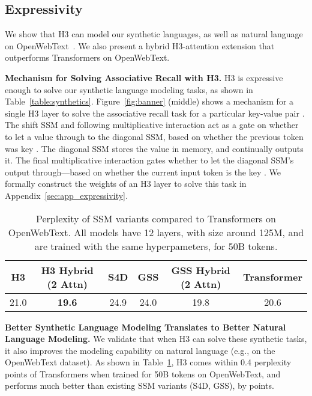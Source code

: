 \documentclass{article}
\newcommand{\hthree}{\textsc{H3}\xspace}
\begin{document}
\subsection{Expressivity}
\label{sec:expressivity}

We show that \hthree can model our synthetic languages, as well as natural language on OpenWebText~\citep{Gokaslan2019OpenWeb}.
We also present a hybrid \hthree-attention extension that outperforms Transformers on OpenWebText.

\textbf{Mechanism for Solving Associative Recall with H3.}
\hthree is expressive enough to solve our synthetic language modeling tasks, as shown in Table~\ref{table:synthetics}.
Figure~\ref{fig:banner} (middle) shows a mechanism for a single \hthree layer to solve the associative recall task for a particular key-value pair .
The shift SSM and following multiplicative interaction act as a gate on whether to let a value through to the diagonal SSM, based on whether the previous token was key .
The diagonal SSM stores the value  in memory, and continually outputs it.
The final multiplicative interaction gates whether to let the diagonal SSM's output through---based on whether the current input token is the key .
We formally construct the weights of an \hthree layer to solve this task in Appendix~\ref{sec:app_expressivity}.

\begin{table}[h]
\small
    \centering
\caption{\label{table:ablations} Perplexity of SSM variants compared to
      Transformers on OpenWebText. All models have 12 layers, with size around 125M, and are trained
      with the same hyperpameters, for 50B tokens.}
{
        \begin{tabular}{@{}|ccccc|c|@{}}
            \hline
\hthree & \hthree Hybrid (2 Attn) & S4D & GSS & GSS Hybrid (2 Attn) & Transformer  \\ \hline
        21.0 & \textbf{19.6} & 24.9 & 24.0 & 19.8 & 20.6 \\ \hline
        \end{tabular}
    }
\end{table} 
\textbf{Better Synthetic Language Modeling Translates to Better Natural Language Modeling.}
We validate that when H3 can solve these synthetic tasks, it also improves the modeling capability on natural language (e.g., on the OpenWebText dataset).
As shown in Table~\ref{table:ablations}, \hthree comes within 0.4 perplexity points of Transformers when trained for 50B tokens on OpenWebText, and performs much better than existing SSM variants (S4D, GSS), by  points.
\end{document}
